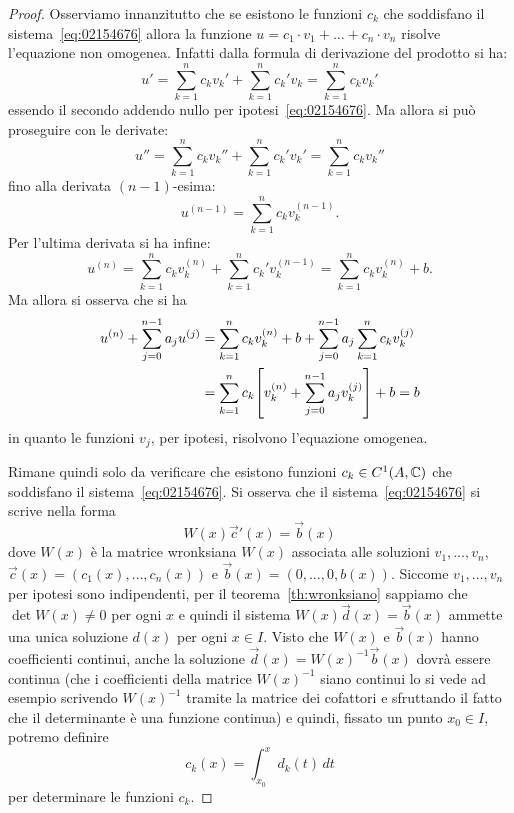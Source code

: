 \begin{proof}
Osserviamo innanzitutto che se esistono le funzioni $c_k$ che
soddisfano il sistema~\eqref{eq:02154676} allora la funzione $u = c_1
\cdot v_1 + \dots + c_n \cdot v_n$ risolve l'equazione non
omogenea. Infatti dalla formula di derivazione del prodotto si ha:
\[
  u' = \sum_{k=1}^n c_k v_k' + \sum_{k=1}^n c_k' v_k
     = \sum_{k=1}^n c_k v_k'
\]
essendo il secondo addendo nullo per ipotesi~\eqref{eq:02154676}.
Ma allora si può proseguire con le derivate:
\[
  u'' = \sum_{k=1}^n c_k v_k'' + \sum_{k=1}^n c_k' v_k'
      = \sum_{k=1}^n c_k v_k''
\]
fino alla derivata $(n-1)$-esima:
\[
  u^{(n-1)} = \sum_{k=1}^n c_k v_k^{(n-1)}.
\]
Per l'ultima derivata si ha infine:
\[
  u^{(n)} = \sum_{k=1}^n c_k v_k^{(n)} + \sum_{k=1}^n c_k' v_k^{(n-1)}
          = \sum_{k=1}^n c_k v_k^{(n)} + b.
\]
Ma allora si osserva che si ha
\begin{align*}
 u^{(n)} + \sum_{j=0}^{n-1} a_j u^{(j)}
 &= \sum_{k=1}^n c_k v_k^{(n)} + b + \sum_{j=0}^{n-1} a_j \sum_{k=1}^n c_k v_k^{(j)} \\
 &= \sum_{k=1}^n c_k {\left[ v_k^{(n)} + \sum_{j=0}^{n-1} a_j v_k^{(j)} \right]} + b = b
\end{align*}
 in quanto le funzioni $v_j$, per ipotesi, risolvono l'equazione omogenea.

 Rimane quindi solo da verificare che esistono funzioni $c_k\in
 C^1(A,{\mathbb C})$ che soddisfano il sistema~\eqref{eq:02154676}.
 Si osserva che il sistema~\eqref{eq:02154676} si scrive nella forma
 \[
   W(x) \vec c'(x) = \vec b(x)
 \]
 dove $W(x)$ è la matrice wronksiana $W(x)$ associata
 alle soluzioni $v_1, \dots, v_n$, $\vec c(x) = (c_1(x), \dots,
 c_n(x))$ e $\vec b(x) = (0, \dots, 0, b(x))$.
 Siccome $v_1, \dots, v_n$ per ipotesi sono indipendenti,
 per il teorema~\ref{th:wronksiano}
 sappiamo che
 $\det W(x)\neq 0$ per ogni $x$ e quindi il sistema $W(x) \vec d(x) =
 \vec b(x)$
 ammette una unica soluzione $d(x)$ per ogni $x\in I$.
 Visto che $W(x)$ e $\vec b(x)$ hanno coefficienti continui,
 anche la soluzione $\vec d(x) = W(x)^{-1} \vec b(x)$ dovrà essere continua (che i coefficienti della matrice $W(x)^{-1}$ siano continui lo si vede ad esempio scrivendo $W(x)^{-1}$ tramite la matrice dei cofattori e sfruttando il fatto che il determinante è una funzione continua)
 e quindi, fissato un punto $x_0\in I$,
 potremo definire
 \[
   c_k(x) = \int_{x_0}^x d_k(t)\, dt
 \]
 per determinare le funzioni $c_k$.
\end{proof}

